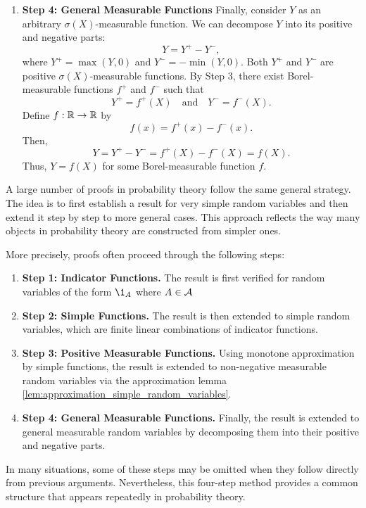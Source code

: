 \documentclass[../Main.tex]{subfiles}
\begin{document}
{\begin{enumerate}
    \item \textbf{ Step 4: General Measurable Functions}
    Finally, consider \( Y \) as an arbitrary \( \sigma(X) \)-measurable function. We can decompose \( Y \) into its positive and negative parts:
    \[ Y = Y^+ - Y^-, \]
    where \( Y^+ = \max(Y, 0) \) and \( Y^- = -\min(Y, 0) \).
    Both \( Y^+ \) and \( Y^- \) are positive \( \sigma(X) \)-measurable functions. By Step 3, there exist Borel-measurable functions \( f^+ \) and \( f^- \) such that
    \[ Y^+ = f^+(X) \quad \text{and} \quad Y^- = f^-(X). \]
    Define \( f : \mathbb{R} \to \mathbb{R} \) by
    \[ f(x) = f^+(x) - f^-(x). \]
    Then,
    \[ Y = Y^+ - Y^- = f^+(X) - f^-(X) = f(X). \]
    Thus, \( Y = f(X) \) for some Borel-measurable function \( f \).
\end{enumerate} }
A large number of proofs in probability theory follow the same general strategy. The idea is to first establish a result for very simple random variables and then extend it step by step to more general cases. This approach reflects the way many objects in probability theory are constructed from simpler ones.

More precisely, proofs often proceed through the following steps:

\begin{enumerate}
\item \textbf{Step 1: Indicator Functions.}
The result is first verified for random variables of the form 
$ \1_A $ where $A\in \mathcal{A}$

\item \textbf{Step 2: Simple Functions.}  
The result is then extended to simple random variables, which are finite linear combinations of indicator functions.

\item \textbf{Step 3: Positive Measurable Functions.}  
Using monotone approximation by simple functions, the result is extended to non-negative measurable random variables via the approximation lemma \ref{lem:approximation_simple_random_variables}.

\item \textbf{Step 4: General Measurable Functions.}  
Finally, the result is extended to general measurable random variables by decomposing them into their positive and negative parts.
\end{enumerate}
In many situations, some of these steps may be omitted when they follow directly from previous arguments. Nevertheless, this four-step method provides a common structure that appears repeatedly in probability theory.
\end{document}
